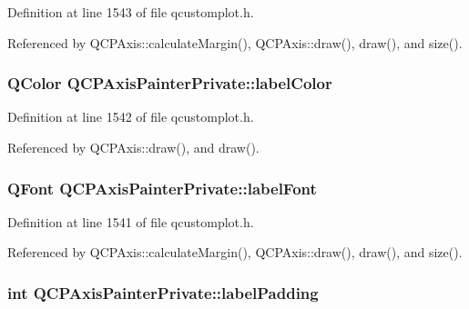 Definition at line 1543 of file qcustomplot.\+h.



Referenced by Q\+C\+P\+Axis\+::calculate\+Margin(), Q\+C\+P\+Axis\+::draw(), draw(), and size().

\hypertarget{class_q_c_p_axis_painter_private_a5c36467daf057da0cf0792f3c5a06089}{}
\subsubsection[{label\+Color}]{\setlength{\rightskip}{0pt plus 5cm}Q\+Color Q\+C\+P\+Axis\+Painter\+Private\+::label\+Color}\label{class_q_c_p_axis_painter_private_a5c36467daf057da0cf0792f3c5a06089}


Definition at line 1542 of file qcustomplot.\+h.



Referenced by Q\+C\+P\+Axis\+::draw(), and draw().

\hypertarget{class_q_c_p_axis_painter_private_add1ff1030fbc36112c19b1468ad82d55}{}
\subsubsection[{label\+Font}]{\setlength{\rightskip}{0pt plus 5cm}Q\+Font Q\+C\+P\+Axis\+Painter\+Private\+::label\+Font}\label{class_q_c_p_axis_painter_private_add1ff1030fbc36112c19b1468ad82d55}


Definition at line 1541 of file qcustomplot.\+h.



Referenced by Q\+C\+P\+Axis\+::calculate\+Margin(), Q\+C\+P\+Axis\+::draw(), draw(), and size().

\hypertarget{class_q_c_p_axis_painter_private_a3f7465372df132bf7814345ea697dd34}{}
\subsubsection[{label\+Padding}]{\setlength{\rightskip}{0pt plus 5cm}int Q\+C\+P\+Axis\+Painter\+Private\+::label\+Padding}\label{class_q_c_p_axis_painter_private_a3f7465372df132bf7814345ea697dd34}



